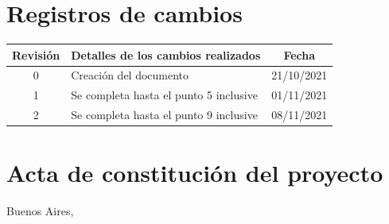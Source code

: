 \documentclass[
11pt, %
codirector, %
]{charter}
\begin{document}
\maketitle
\thispagestyle{empty}
\pagebreak


\thispagestyle{empty}
{\setlength{\parskip}{0pt}
\tableofcontents{}
}
\pagebreak


\section*{Registros de cambios}
\label{sec:registro}


\begin{table}[ht]
\label{tab:registro}
\centering
\begin{tabularx}{\linewidth}{@{}|c|X|c|@{}}
\hline
\rowcolor[HTML]{C0C0C0} 
Revisión & \multicolumn{1}{c|}{\cellcolor[HTML]{C0C0C0}Detalles de los cambios realizados} & Fecha      \\ \hline
0      & Creación del documento                                 & 21/10/2021 \\ \hline
1      & Se completa hasta el punto 5 inclusive                 & 01/11/2021 \\ \hline
2      & Se completa hasta el punto 9 inclusive                 & 08/11/2021 \\ \hline
\end{tabularx}
\end{table}

\pagebreak



\section*{Acta de constitución del proyecto}
\label{sec:acta}

\begin{flushright}
Buenos Aires, \fechaInicioName
\end{flushright}

\vspace{2cm}
\end{document}
